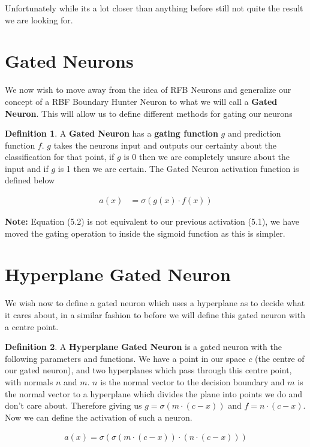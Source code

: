 \documentclass[notitlepage]{report}
\theoremstyle{definition}
\newtheorem{definition}{Definition}[section]
\begin{document}
Unfortunately while its a lot closer than anything before still not quite the result we are looking for.

\section{Gated Neurons}
We now wish to move away from the idea of RFB Neurons and generalize our concept of a RBF Boundary Hunter Neuron to what we will call a \textbf{Gated Neuron}. This will allow us to define different methods for gating our neurons

\theoremstyle{definition}
\begin{definition}
A \textbf{Gated Neuron} has a \textbf{gating function} $g$ and prediction function $f$. $g$ takes the neurons input and outputs our certainty about the classification for that point, if $g$ is 0 then we are completely unsure about the input and if $g$ is 1 then we are certain. The Gated Neuron activation function is defined below

\begin{align}
a(x) &= \sigma(g(x) \cdot f(x))
\end{align}

\textbf{Note: } Equation (5.2) is not equivalent to our previous activation (5.1), we have moved the gating operation to inside the sigmoid function as this is simpler.

\end{definition}

\section{Hyperplane Gated Neuron}
We wish now to define a gated neuron which uses a hyperplane as to decide what it cares about, in a similar fashion to before we will define this gated neuron with a centre point.

\theoremstyle{definition}
\begin{definition}
A \textbf{Hyperplane Gated Neuron} is a gated neuron with the following parameters and functions. We have a point in our space $c$ (the centre of our gated neuron), and two hyperplanes which pass through this centre point, with normals $n$ and $m$. $n$ is the normal vector to the decision boundary and $m$ is the normal vector to a hyperplane which divides the plane into points we do and don't care about. Therefore giving us $g = \sigma(m \cdot (c - x))$ and $f = n \cdot (c - x)$. Now we can define the activation of such a neuron.

\begin{align}
a(x) = \sigma(\sigma(m \cdot (c - x)) \cdot (n \cdot (c - x)))
\end{align}

\end{definition}
\end{document}
